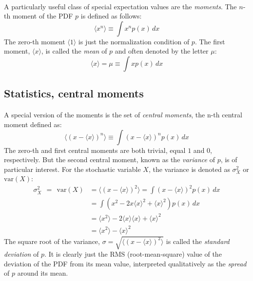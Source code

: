 \documentclass[%
oneside,                 %
final,                   %
10pt]{article}
\begin{document}
\paragraph{}
A particularly useful class of special expectation values are the
\emph{moments}. The $n$-th moment of the PDF $p$ is defined as
follows:
\[
\langle x^n\rangle \equiv \int\! x^n p(x)\,dx
\]
The zero-th moment $\langle 1\rangle$ is just the normalization condition of
$p$. The first moment, $\langle x\rangle$, is called the \emph{mean} of $p$
and often denoted by the letter $\mu$:
\[
\langle x\rangle = \mu \equiv \int\! x p(x)\,dx
\]



\subsection*{Statistics, central moments}

\paragraph{}
A special version of the moments is the set of \emph{central moments},
the n-th central moment defined as:
\[
\langle (x-\langle x \rangle )^n\rangle \equiv \int\! (x-\langle x\rangle)^n p(x)\,dx
\]
The zero-th and first central moments are both trivial, equal $1$ and
$0$, respectively. But the second central moment, known as the
\emph{variance} of $p$, is of particular interest. For the stochastic
variable $X$, the variance is denoted as $\sigma^2_X$ or $\mathrm{var}(X)$:
\begin{align}
\sigma^2_X\ \ =\ \ \mathrm{var}(X) & =  \langle (x-\langle x\rangle)^2\rangle =
\int\! (x-\langle x\rangle)^2 p(x)\,dx\\
& =  \int\! \left(x^2 - 2 x \langle x\rangle^{2} +
  \langle x\rangle^2\right)p(x)\,dx\\
& =  \langle x^2\rangle - 2 \langle x\rangle\langle x\rangle + \langle x\rangle^2\\
& =  \langle x^2\rangle - \langle x\rangle^2
\end{align}
The square root of the variance, $\sigma =\sqrt{\langle (x-\langle x\rangle)^2\rangle}$ is called the \emph{standard deviation} of $p$. It is clearly just the RMS (root-mean-square)
value of the deviation of the PDF from its mean value, interpreted
qualitatively as the \emph{spread} of $p$ around its mean.
\end{document}
